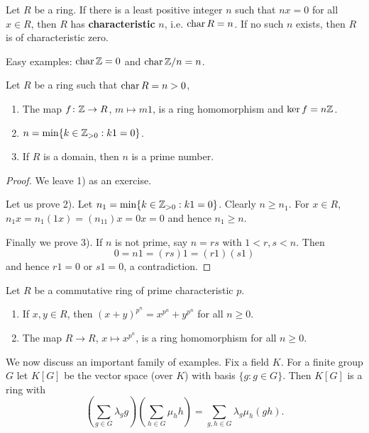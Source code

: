 
\begin{definition}
Let $R$ be a ring. If there is a least positive integer $n$ such that 
$nx=0$ for all $x\in R$, then $R$ has \textbf{characteristic} $n$, i.e. $\operatorname{char} R=n$. If no such $n$ exists, 
then $R$ is of characteristic zero. 
\end{definition}

Easy examples: $\operatorname{char}\mathbb{Z}=0$ and $\operatorname{char}\mathbb{Z}/n=n$.

\begin{proposition}
    Let $R$ be a ring such that $\operatorname{char} R=n>0$,
    \begin{enumerate}
        \item The map $f\colon \mathbb{Z}\to R$, $m\mapsto m1$, is a ring homomorphism and $\ker f=n\mathbb{Z}$.  
        \item $n=\min\{k\in\mathbb{Z}_{>0}:k1=0\}$.
        \item If $R$ is a domain, then $n$ is a prime number.
    \end{enumerate}
\end{proposition}

\begin{proof}
    We leave 1) as an exercise. 
    
    Let us prove 2). Let $n_1=\min\{k\in\mathbb{Z}_{>0}:k1=0\}$. Clearly 
    $n\geq n_1$. For $x\in R$,
    $n_1x=n_1(1x)=(n_11)x=0x=0$ 
    and hence $n_1\geq n$. 
    
    Finally we prove 3). If $n$ is not prime, say
    $n=rs$ with $1<r,s<n$. Then 
    \[
    0=n1=(rs)1=(r1)(s1)
    \]
    and hence $r1=0$ or $s1=0$, a contradiction. 
\end{proof}

\begin{exercise}
\label{xca:freshman_dream}
    Let $R$ be a commutative ring of prime characteristic $p$. 
    \begin{enumerate}
        \item If $x,y\in R$, then $(x+y)^{p^n}=x^{p^n}+y^{p^n}$ for all $n\geq0$. 
        \item The map $R\to R$, $x\mapsto x^{p^n}$, is a ring homomorphism for all $n\geq0$.
    \end{enumerate}
\end{exercise}


We now discuss an important family of examples. 
Fix a field $K$. 
For a finite group $G$ let $K[G]$ be the vector space (over $K$)
with basis $\{g:g\in G\}$. Then $K[G]$ is a ring
with
\[
\left(\sum_{g\in G}\lambda_gg\right)\left(\sum_{h\in G}\mu_hh\right)
=\sum_{g,h\in G}\lambda_g\mu_h(gh).
\] 

